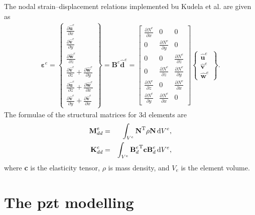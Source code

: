 \documentclass[11pt,a4paper,final]{report}
\theoremstyle{plain}
\begin{document}
The nodal strain--displacement relations implemented bu Kudela et al. \cite{kudela20093d} are given as
\begin{eqnarray}
	\boldsymbol{\varepsilon}^e = 
	\left \{ \begin{array}{c}
		\frac{\partial \widehat{\textbf{u}}^e}{\partial x} \\
		\frac{\partial \widehat{\textbf{v}}^e}{\partial y} \\
		\frac{\partial \widehat{\textbf{w}}^e}{\partial z} \\
		\frac{\partial \widehat{\textbf{v}}^e}{\partial z} + \frac{\partial \widehat{\textbf{w}}^e}{\partial y}\\
		\frac{\partial \widehat{\textbf{u}}^e}{\partial z} + \frac{\partial \widehat{\textbf{w}}^e}{\partial x}\\
		\frac{\partial \widehat{\textbf{v}}^e}{\partial y} + \frac{\partial \widehat{\textbf{v}}^e}{\partial x}
	\end{array} \right\} = \textbf{B}^e\widehat{\textbf{d}}^e =
	\left [
	\begin{array}{ccc}
		\frac{\partial N^e}{\partial x} & 0 & 0\\
		0 & \frac{\partial N^e}{\partial y} & 0\\
		0 & 0 & \frac{\partial N^e}{\partial z}\\
		0 & \frac{\partial N^e}{\partial z} & \frac{\partial N^e}{\partial y}\\
		\frac{\partial N^e}{\partial z} & 0 & \frac{\partial N^e}{\partial x}\\
		\frac{\partial N^e}{\partial y} & \frac{\partial N^e}{\partial x} & 0
	\end{array} \right]
	\left \{ \begin{array}{c}
		\widehat{\textbf{u}}^e \\
		\widehat{\textbf{v}}^e \\
		\widehat{\textbf{w}}^e
	\end{array} \right\}.
\end{eqnarray}
The formulae of the structural matrices for \ac{3d} elements are
\begin{eqnarray}
	\textbf{M}_{dd}^e & = & \int_{V^e}\textbf{N}^{\mathrm{T}}\rho \textbf{N} \mathop{}\!\mathrm{d} V^e,\\
	\textbf{K}_{dd}^e & = & \int_{V^e}{\textbf{B}_d^e}^{\mathrm{T}}\textbf{c}\textbf{B}_d^e \mathop{}\!\mathrm{d} V^e,
\end{eqnarray}
where \textbf{c} is the elasticity tensor, \(\rho\) is mass density, and \(V_e\) is the element volume. \section{The \acl{pzt} modelling}
\label{sec:PZTmodel}
\end{document}
